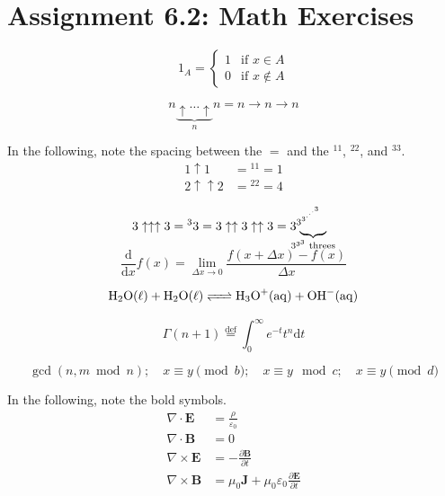 \chapter{Assignment 6.2: Math Exercises}

\begin{equation}
    1_A = \begin{cases} 
    1 & \text{if } x \in A \\
    0 & \text{if } x \notin A 
    \end{cases}
\end{equation}

\begin{equation}
    n \underbrace{\uparrow \dots \uparrow}_{n} n = n \rightarrow n \rightarrow n
\end{equation}

\noindent In the following, note the spacing between the $=$ and the ${}^11$, ${}^22$, and ${}^33$.
\begin{align*}
    1 \uparrow 1 &= {}^11 = 1 \\
    2 \uparrow \uparrow 2 &= {}^22 = 4
\end{align*}

\begin{equation}
    3 \uparrow \uparrow \uparrow 3 = {}^33 = 3 \uparrow \uparrow 3 \uparrow \uparrow 3 = 3^{3^{3^{\cdot^{\cdot^{\cdot^3}}}}} \mkern-45mu \smash{\underbrace{\phantom{3^{3^{3^{3^3}}}}}_{3^{3^3} \text{ threes}}}
\end{equation}

\begin{equation}
    \frac{\mathrm{d}}{\mathrm{d}x} f(x) = \lim_{\Delta x \to 0} \frac{f(x + \Delta x) - f(x)}{\Delta x}
\end{equation}

\begin{equation}
    \ce{H2O($\ell$) + H2O($\ell$) <=> H3O+(aq) + OH-(aq)}
\end{equation}

\begin{equation}
    \Gamma(n+1) \stackrel{\text{def}}{=} \int_{0}^{\infty} e^{-t} t^n \mathrm{d}t
\end{equation}

\begin{equation}
    \gcd(n, m \bmod n); \quad x \equiv y \pmod{b}; \quad x \equiv y \mod c; \quad x \equiv y \pmod d
\end{equation}

\noindent In the following, note the bold symbols.
\begin{equation}
    \begin{aligned}
        \nabla \cdot \mathbf{E} &= \frac{\rho}{\varepsilon_0} \\
        \nabla \cdot \mathbf{B} &= 0 \\
        \nabla \times \mathbf{E} &= -\frac{\partial \mathbf{B}}{\partial t} \\
        \nabla \times \mathbf{B} &= \mu_0 \mathbf{J} + \mu_0 \varepsilon_0 \frac{\partial \mathbf{E}}{\partial t}
    \end{aligned}
\end{equation}